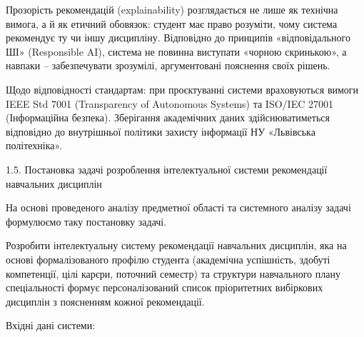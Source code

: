 \documentclass[
]{article}
\begin{document}
Прозорість рекомендацій (explainability) розглядається не лише як
технічна вимога, а й як етичний обов\textquotesingle язок: студент має
право розуміти, чому система рекомендує ту чи іншу дисципліну.
Відповідно до принципів «відповідального ШІ» (Responsible AI), система
не повинна виступати «чорною скринькою», а навпаки -- забезпечувати
зрозумілі, аргументовані пояснення своїх рішень.

Щодо відповідності стандартам: при проєктуванні системи враховуються
вимоги IEEE Std 7001 (Transparency of Autonomous Systems) та ISO/IEC
27001 (Інформаційна безпека). Зберігання академічних даних
здійснюватиметься відповідно до внутрішньої політики захисту інформації
НУ «Львівська політехніка».

\protect{}\label{_Toc230434083}{}1.5. Постановка задачі
розроблення інтелектуальної системи рекомендації навчальних дисциплін

На основі проведеного аналізу предметної області та системного аналізу
задачі формулюємо таку постановку задачі.

Розробити інтелектуальну систему рекомендації навчальних дисциплін, яка
на основі формалізованого профілю студента (академічна успішність,
здобуті компетенції, цілі кар\textquotesingle єри, поточний семестр) та
структури навчального плану спеціальності формує персоналізований список
пріоритетних вибіркових дисциплін з поясненням кожної рекомендації.

Вхідні дані системи:
\end{document}
